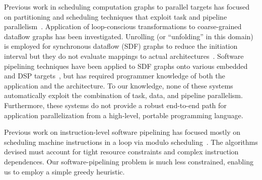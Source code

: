 
Previous work in scheduling computation graphs to parallel targets has
focused on partitioning and scheduling techniques that exploit task
and pipeline parallelism~\cite{SDFSched, SDFSched2,may87communicating,
DAGSched, pipeline-sdf}.  Application of loop-conscious
transformations to coarse-grained dataflow graphs has been
investigated.  Unrolling (or ``unfolding'' in this domain) is employed
for synchronous dataflow (SDF) graphs to reduce the initiation
interval but they do not evaluate mappings to actual
architectures~\cite{unfolding,unfolding2}. Software pipelining
techniques have been applied to SDF graphs onto various embedded and
DSP targets~\cite{bakshi99,chatha-02}, but has required programmer
knowledge of both the application and the architecture. To our
knowledge, none of these systems automatically exploit the combination
of task, data, and pipeline parallelism.  Furthermore, these systems
do not provide a robust end-to-end path for application
parallelization from a high-level, portable programming language.

Previous work on instruction-level software pipelining has focused
mostly on scheduling machine instructions in a loop via modulo
scheduling~\cite{rau81,lam-softpipe}.  The algorithms devised must
account for tight resource constraints and complex instruction
dependences. Our software-pipelining problem is much less constrained,
enabling us to employ a simple greedy heuristic.  

